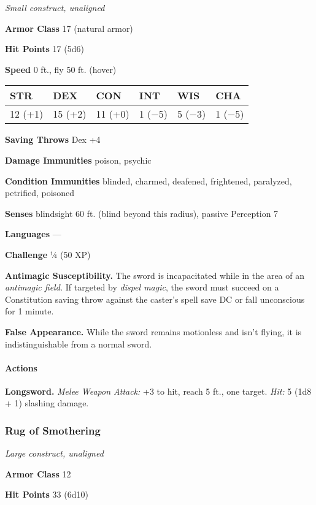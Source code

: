 \documentclass[
]{article}
\begin{document}
\emph{Small construct, unaligned}

\textbf{Armor Class} 17 (natural armor)

\textbf{Hit Points} 17 (5d6)

\textbf{Speed} 0 ft., fly 50 ft. (hover)

\begin{longtable}[]{@{}llllll@{}}
\toprule
STR & DEX & CON & INT & WIS & CHA\tabularnewline
\midrule
\endhead
12 (+1) & 15 (+2) & 11 (+0) & 1 (−5) & 5 (−3) & 1 (−5)\tabularnewline
\bottomrule
\end{longtable}

\textbf{Saving Throws} Dex +4

\textbf{Damage Immunities} poison, psychic

\textbf{Condition Immunities} blinded, charmed, deafened, frightened,
paralyzed, petrified, poisoned

\textbf{Senses} blindsight 60 ft. (blind beyond this radius), passive
Perception 7

\textbf{Languages} ---

\textbf{Challenge} ¼ (50 XP)

\textbf{Antimagic Susceptibility.} The sword is incapacitated while in
the area of an \emph{antimagic field.} If targeted by \emph{dispel
magic}, the sword must succeed on a Constitution saving throw against
the caster's spell save DC or fall unconscious for 1 minute.

\textbf{False Appearance.} While the sword remains motionless and isn't
flying, it is indistinguishable from a normal sword.

\hypertarget{actions-5}{%
\paragraph{Actions}\label{actions-5}}

\textbf{Longsword.} \emph{Melee Weapon Attack:} +3 to hit, reach 5 ft.,
one target. \emph{Hit:} 5 (1d8 + 1) slashing damage.

\hypertarget{rug-of-smothering}{%
\subsubsection{Rug of Smothering}\label{rug-of-smothering}}

\emph{Large construct, unaligned}

\textbf{Armor Class} 12

\textbf{Hit Points} 33 (6d10)
\end{document}

